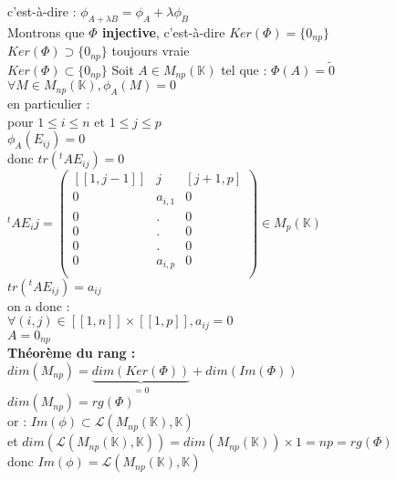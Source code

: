 \documentclass{article}
\begin{document}
c'est-à-dire : $\phi_{A+ \lambda B}=\phi_A + \lambda \phi_B$ \\
Montrons que {\bf \boldmath $\Phi$ injective}, c'est-à-dire $Ker(\Phi)= \lbrace 0_{np}\rbrace $ \\
$Ker( \Phi) \supset  \lbrace 0_{np}\rbrace$ toujours vraie \\
$Ker( \Phi) \subset  \lbrace 0_{np}\rbrace$ Soit $A \in M_{np}(\mathbb K)$ tel que : $\Phi(A)=\tilde{0}$ \\
$\forall M \in M_{np}(\mathbb K), \phi_A(M)=0$ \\
en particulier : \\
pour $1 \leq i \leq n$ et $1 \leq j \leq p$ \\
$\phi_A(E_{ij})=0$ \\
donc $tr({}^t A E_{ij})=0$ \\
${}^t A E_ij = \begin{pmatrix}
[[1, j-1]] & j & [j+1, p] \\
0	& a_{i,1} &0 \\
0	& . & 0\\
0	& . & 0\\
0	& . & 0\\
0	& a_{i,p} & 0 \\
\end{pmatrix} \in M_p( \mathbb K) $ \\
$tr({}^t A E_{ij})= a_{ij}$ \\
on a donc : \\
$\forall (i,j) \in [[1,n]] \times [[1,p]], a_{ij}= 0$ \\
$A= 0_{np}$ \\
{ \bf Théorème du rang :} \\
$dim(M_{np})=\underbrace{dim(Ker(\Phi))}_{=0}+ dim (Im(\Phi))$ \\
$dim(M_{np})= rg(\Phi)$ \\
or : $Im( \phi) \subset  \mathcal L(M_{np}(\mathbb K), \mathbb K)$ \\
et $dim( \mathcal L(M_{np}(\mathbb K), \mathbb K))= dim( M_{np}(\mathbb K)) \times 1 =np=rg(\Phi)$ \\
donc $Im(\phi)=  \mathcal L(M_{np}(\mathbb K), \mathbb K)$
\end{document}
